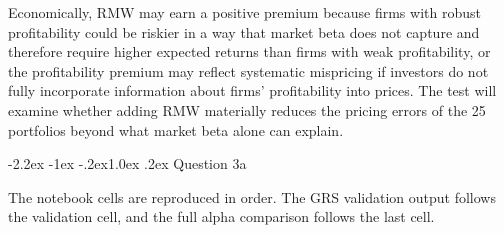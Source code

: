 \documentclass[11pt]{article}
\makeatletter
\renewcommand\subsection{\@startsection{subsection}{2}{0pt}%
  {-2.2ex \@plus -1ex \@minus -.2ex}{1.0ex \@plus .2ex}%
  {\normalfont\bfseries\normalsize\color{psink}}}
\makeatother
\begin{document}
Economically, RMW may earn a positive premium because firms with robust
profitability could be riskier in a way that market beta does not capture and
therefore require higher expected returns than firms with weak profitability,
or the profitability premium may reflect systematic mispricing if
investors do not fully incorporate information about firms' profitability
into prices. The test will examine whether adding RMW materially reduces the
pricing errors of the 25 portfolios beyond what market beta alone can
explain.

\subsection{Question 3a}

The notebook cells are reproduced in order. The GRS validation output
follows the validation cell, and the full alpha comparison follows the last
cell.
\end{document}
